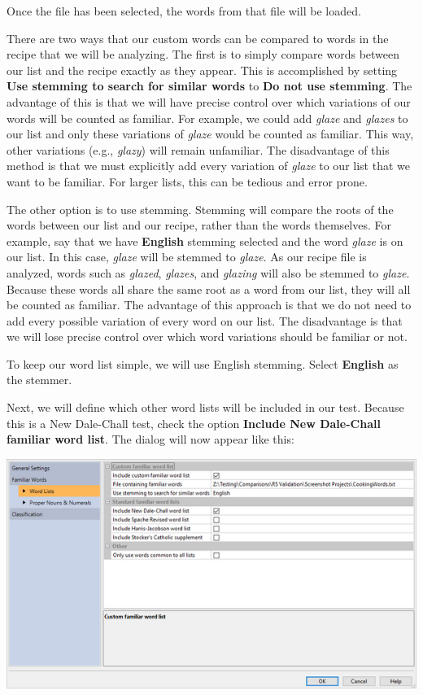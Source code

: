 \documentclass[
]{book}
\theoremstyle{definition}
\theoremstyle{definition}
\theoremstyle{definition}
\theoremstyle{definition}
\theoremstyle{remark}
\begin{document}
Once the file has been selected, the words from that file will be loaded.

There are two ways that our custom words can be compared to words in the recipe that we will be analyzing. The first is to simply compare words between our list and the recipe exactly as they appear. This is accomplished by setting \textbf{Use stemming to search for similar words} to \textbf{Do not use stemming}. The advantage of this is that we will have precise control over which variations of our words will be counted as familiar. For example, we could add \emph{glaze} and \emph{glazes} to our list and only these variations of \emph{glaze} would be counted as familiar. This way, other variations (e.g., \emph{glazy}) will remain unfamiliar. The disadvantage of this method is that we must explicitly add every variation of \emph{glaze} to our list that we want to be familiar. For larger lists, this can be tedious and error prone.

The other option is to use stemming. Stemming will compare the roots of the words between our list and our recipe, rather than the words themselves. For example, say that we have \textbf{English} stemming selected and the word \emph{glaze} is on our list. In this case, \emph{glaze} will be stemmed to \emph{glaze}. As our recipe file is analyzed, words such as \emph{glazed}, \emph{glazes}, and \emph{glazing} will also be stemmed to \emph{glaze}. Because these words all share the same root as a word from our list, they will all be counted as familiar. The advantage of this approach is that we do not need to add every possible variation of every word on our list. The disadvantage is that we will lose precise control over which word variations should be familiar or not.

To keep our word list simple, we will use English stemming. Select \textbf{English} as the stemmer.

Next, we will define which other word lists will be included in our test. Because this is a New Dale-Chall test, check the option \textbf{Include New Dale-Chall familiar word list}. The dialog will now appear like this:

\includegraphics{Images/CustomTestExample2WordSettingsFinished.png}
\end{document}

